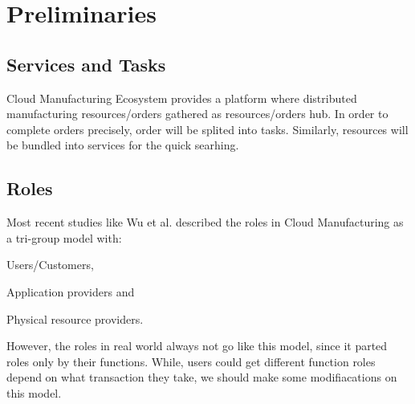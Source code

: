 \section{Preliminaries} %
 
\subsection{Services and Tasks}
Cloud Manufacturing Ecosystem provides a platform where distributed manufacturing resources/orders gathered as resources/orders hub. In order to complete orders precisely, order will be splited into tasks. Similarly, resources will be bundled into services for the quick searhing.

\subsection{Roles}
Most recent studies like Wu et al.\cite{Wu2013} described the roles in Cloud Manufacturing as a tri-group model with:\begin{inparaenum}[1)]
\item Users/Customers,
\item Application providers and
\item Physical resource providers.
\end{inparaenum}
However, the roles in real world always not go like this model, since it parted roles only by their functions. While, users could get different function roles depend on what transaction they take, we should make some modifiacations on this model.

